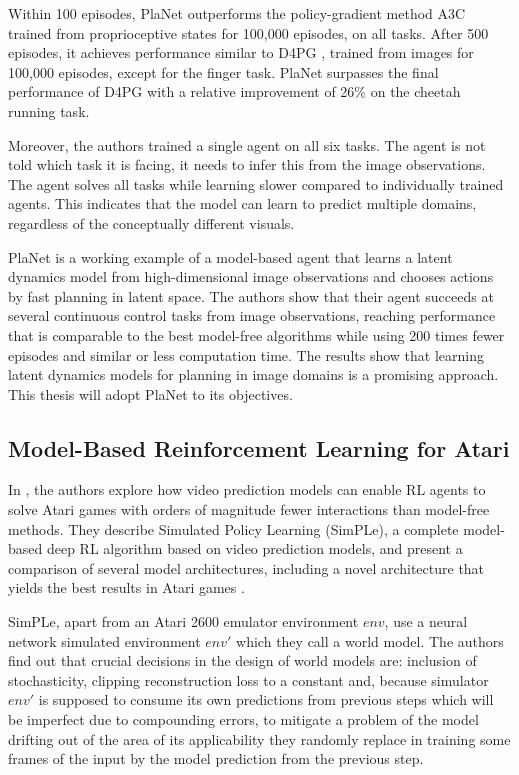 Within 100 episodes, PlaNet outperforms the policy-gradient method A3C \cite{Algo.A3C} trained from proprioceptive states for 100,000 episodes, on all tasks. After 500 episodes, it achieves performance similar to D4PG \cite{Algo.D4PG}, trained from images for 100,000 episodes, except for the finger task. PlaNet surpasses the final performance of D4PG with a relative improvement of 26\% on the cheetah running task.

Moreover, the authors trained a single agent on all six tasks. The agent is not told which task it is facing, it needs to infer this from the image observations. The agent solves all tasks while learning slower compared to individually trained agents. This indicates that the model can learn to predict multiple domains, regardless of the conceptually different visuals.

PlaNet is a working example of a model-based agent that learns a latent dynamics model from high-dimensional image observations and chooses actions by fast planning in latent space. The authors show that their agent succeeds at several continuous control tasks from image observations, reaching performance that is comparable to the best model-free algorithms while using 200 times fewer episodes and similar or less computation time. The results show that learning latent dynamics models for planning in image domains is a promising approach. This thesis will adopt PlaNet to its objectives.

\subsection{Model-Based Reinforcement Learning for Atari}

In \cite{Algo.SimPLe}, the authors explore how video prediction models can enable RL agents to solve Atari games with orders of magnitude fewer interactions than model-free methods. They describe Simulated Policy Learning (SimPLe), a complete model-based deep RL algorithm based on video prediction models, and present a comparison of several model architectures, including a novel architecture that yields the best results in Atari games \cite{Code.ALE}.

SimPLe, apart from an Atari 2600 emulator environment $env$, use a neural network simulated environment $env'$ which they call a world model. The authors find out that crucial decisions in the design of world models are: inclusion of stochasticity, clipping reconstruction loss to a constant and, because simulator $env'$ is supposed to consume its own predictions from previous steps which will be imperfect due to compounding errors, to mitigate a problem of the model drifting out of the area of its applicability they randomly replace in training some frames of the input by the model prediction from the previous step. 

